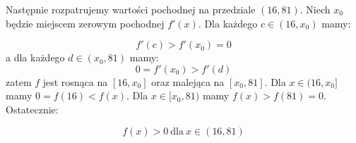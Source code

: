 \documentclass{article}
\begin{document}
Następnie rozpatrujemy wartości pochodnej na przedziale \((16, 81)\). Niech \(x_{0}\) będzie miejscem zerowym
pochodnej \(f'(x)\). Dla każdego \(c \in (16, x_{0})\) mamy:

\begin{equation*}
    f'(c) > f'(x_{0}) = 0
\end{equation*}
a dla każdego \(d \in (x_{0}, 81)\) mamy:
\begin{equation*}
    0 = f'(x_{0}) > f'(d)
\end{equation*}
zatem \(f\) jest rosnąca na \([16, x_{0}]\) oraz malejąca na \([x_{0}, 81]\). Dla \(x \in (16, x_{0}]\) mamy
\(0 = f(16) < f(x)\). Dla \(x \in [x_{0}, 81)\) mamy \(f(x) > f(81) = 0\). Ostatecznie:

\begin{equation*}
    f(x) > 0 \ \mbox{dla} \ x \in (16, 81)
\end{equation*}
\end{document}
